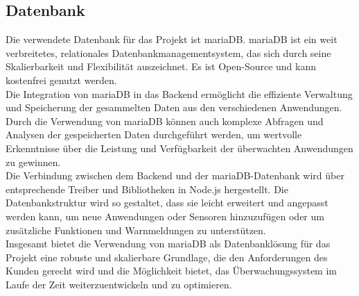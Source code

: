 \begin{flushleft}
		\subsection{Datenbank}
			Die verwendete Datenbank für das Projekt ist \acs{mariaDB}. \acs{mariaDB} ist ein weit verbreitetes, relationales Datenbankmanagementsystem, das sich durch seine Skalierbarkeit und Flexibilität auszeichnet. Es ist Open-Source und kann kostenfrei genutzt werden.\\
			Die Integration von \acs{mariaDB} in das Backend ermöglicht die effiziente Verwaltung und Speicherung der gesammelten Daten aus den verschiedenen Anwendungen. Durch die Verwendung von \acs{mariaDB} können auch komplexe Abfragen und Analysen der gespeicherten Daten durchgeführt werden, um wertvolle Erkenntnisse über die Leistung und Verfügbarkeit der überwachten Anwendungen zu gewinnen.\\
			Die Verbindung zwischen dem Backend und der \acs{mariaDB}-Datenbank wird über entsprechende Treiber und Bibliotheken in Node.js hergestellt. Die Datenbankstruktur wird so gestaltet, dass sie leicht erweitert und angepasst werden kann, um neue Anwendungen oder Sensoren hinzuzufügen oder um zusätzliche Funktionen und Warnmeldungen zu unterstützen.\\
			Insgesamt bietet die Verwendung von \acs{mariaDB} als Datenbanklösung für das Projekt eine robuste und skalierbare Grundlage, die den Anforderungen des Kunden gerecht wird und die Möglichkeit bietet, das Überwachungssystem im Laufe der Zeit weiterzuentwickeln und zu optimieren.\\



\end{flushleft}
